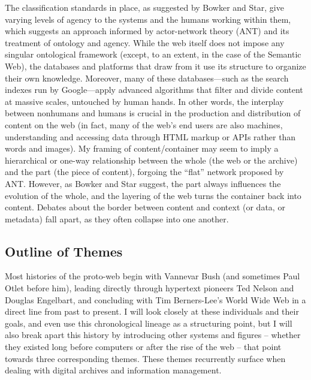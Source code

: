 The classification standards in place, as suggested by Bowker and Star, give varying levels of agency to the systems and the humans working within them, which suggests an approach informed by actor-network theory (ANT) and its treatment of ontology and agency.\autocite{latour} While the web itself does not impose any singular ontological framework (except, to an extent, in the case of the Semantic Web), the databases and platforms that draw from it use its structure to organize their own knowledge. Moreover, many of these databases---such as the search indexes run by Google---apply advanced algorithms that filter and divide content at massive scales, untouched by human hands. In other words, the interplay between nonhumans and humans is crucial in the production and distribution of content on the web (in fact, many of the web's end users are also machines, understanding and accessing data through HTML markup or APIs rather than words and images). My framing of content/container may seem to imply a hierarchical or one-way relationship between the whole (the web or the archive) and the part (the piece of content), forgoing the ``flat'' network proposed by ANT. However, as Bowker and Star suggest, the part always influences the evolution of the whole, and the layering of the web turns the container back into content. Debates about the border between content and context (or data, or metadata) fall apart, as they often collapse into one another.

\subsection{}







\subsection{Outline of Themes}

Most histories of the proto-web begin with Vannevar Bush (and sometimes Paul Otlet before him), leading directly through hypertext pioneers Ted Nelson and Douglas Engelbart, and concluding with Tim Berners-Lee’s World Wide Web in a direct line from past to present. I will look closely at these individuals and their goals, and even use this chronological lineage as a structuring point, but I will also break apart this history by introducing other systems and figures – whether they existed long before computers or after the rise of the web – that point towards three corresponding themes. These themes recurrently surface when dealing with digital archives and information management.


